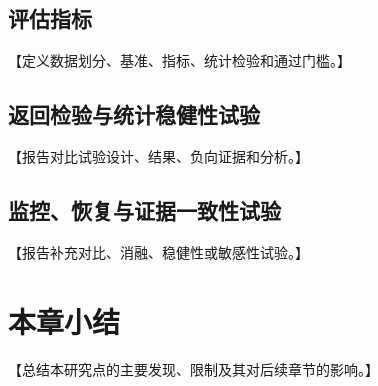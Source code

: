 \subsection{评估指标}

【定义数据划分、基准、指标、统计检验和通过门槛。】

\subsection{返回检验与统计稳健性试验}

【报告对比试验设计、结果、负向证据和分析。】

\subsection{监控、恢复与证据一致性试验}

【报告补充对比、消融、稳健性或敏感性试验。】

\section{本章小结}

【总结本研究点的主要发现、限制及其对后续章节的影响。】
